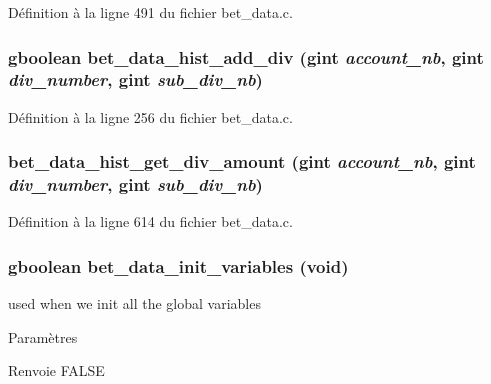 Définition à la ligne 491 du fichier bet\_\-data.c.

\subsubsection[{bet\_\-data\_\-hist\_\-add\_\-div}]{\setlength{\rightskip}{0pt plus 5cm}gboolean bet\_\-data\_\-hist\_\-add\_\-div (gint {\em account\_\-nb}, \/  gint {\em div\_\-number}, \/  gint {\em sub\_\-div\_\-nb})}\label{bet__data_8c_a8e4e124545cf8a530c9c3ad879bcf5ea}


Définition à la ligne 256 du fichier bet\_\-data.c.

\subsubsection[{bet\_\-data\_\-hist\_\-get\_\-div\_\-amount}]{ bet\_\-data\_\-hist\_\-get\_\-div\_\-amount (gint {\em account\_\-nb}, \/  gint {\em div\_\-number}, \/  gint {\em sub\_\-div\_\-nb})}\label{bet__data_8c_aa0afee08549af46994f0cd802d462338}


Définition à la ligne 614 du fichier bet\_\-data.c.

\subsubsection[{bet\_\-data\_\-init\_\-variables}]{\setlength{\rightskip}{0pt plus 5cm}gboolean bet\_\-data\_\-init\_\-variables (void)}\label{bet__data_8c_ac36863d207e1ef101c501a31760e67a1}
used when we init all the global variables


\begin{DoxyParams}{Paramètres}
\item[{\em }]\end{DoxyParams}
\begin{DoxyReturn}{Renvoie}
FALSE 
\end{DoxyReturn}


